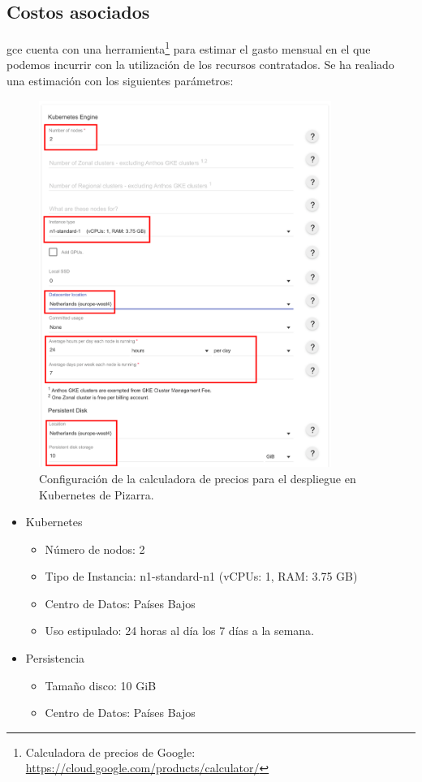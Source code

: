 \documentclass[11pt,spanish,listoffigures,listoftables]{tfgetsinf}
\begin{document}
\subsection{Costos asociados}

\acrshort{gce} cuenta con una herramienta\footnote{Calculadora de precios de Google: \url{https://cloud.google.com/products/calculator/}} para estimar el gasto mensual en el que podemos incurrir con la utilización de los recursos contratados. Se ha realiado una estimación con los siguientes parámetros:

\begin{figure}[ht]
	\centering
	\includegraphics[width=0.85\textwidth]{img/google-cloud-engine-cluster-cost}
	\caption[Calculadora de precios en GCE]{Configuración de la calculadora de precios para el despliegue en Kubernetes de Pizarra.}
	\label{figura:gce-estimated-cost}
\end{figure}

\begin{itemize}
	\item  Kubernetes
	\begin{itemize}
		\item Número de nodos: 2
		\item Tipo de Instancia: n1-standard-n1 (vCPUs: 1, RAM: 3.75 GB)
		\item Centro de Datos: Países Bajos 
	    \item Uso estipulado: 24 horas al día los 7 días a la semana.
	 \end{itemize}
    \item Persistencia
	\begin{itemize}
		\item Tamaño disco: 10 GiB
		\item Centro de Datos: Países Bajos
    \end{itemize}
\end{itemize}
\end{document}

